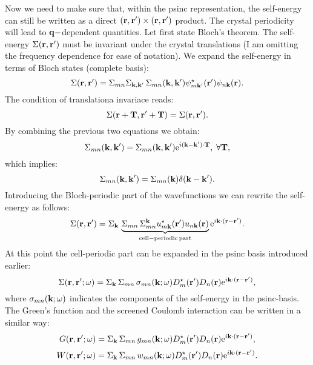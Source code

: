\documentclass[12pt]{article}
\def\k{{\bf k}}
\def\kp{{\bf k}^\prime}
\def\q{{\bf q}}
\def\r{{\bf r}}
\def\rp{{\bf r}^\prime}
\def\w{\omega}
\begin{document}
Now we need to make sure that, within the psinc representation, the self-energy can still be written
as a direct $(\r,\rp) \times (\r,\rp)$ product. The crystal periodicity will lead to $\q-$dependent
quantities. 
%
Let first state Bloch's theorem. The self-energy $\Sigma(\r,\rp)$ must be invariant under the crystal
translations (I am omitting the frequency dependence for ease of notation). We expand the self-energy
in terms of Bloch states (complete basis):
  \begin{equation}
  \Sigma(\r,\rp) = \Sigma_{mn}\Sigma_{\k,\kp} \, \Sigma_{mn}(\k,\kp) \psi^\star_{m\kp}(\rp) \psi_{n\k}(\r).
  \end{equation}
The condition of translationa invariace reads:
  \begin{equation}
  \Sigma(\r+{\bf T},\rp+{\bf T}) =  \Sigma(\r,\rp).
  \end{equation}
By combining the previous two equations we obtain:
  \begin{equation}
  \Sigma_{mn}(\k,\kp) =  \Sigma_{mn}(\k,\kp) {\rm e}^{i(\k-\kp)\cdot{\bf T}}, \; \forall {\bf T},
  \end{equation}
which implies:
  \begin{equation}
  \Sigma_{mn}(\k,\kp) =  \Sigma_{mn}(\k) \delta(\k-\kp).
  \end{equation}
Introducing the Bloch-periodic part of the wavefunctions we can rewrite the self-energy as follows:
  \begin{equation}
  \Sigma(\r,\rp) = \Sigma_\k \, \underbrace{\Sigma_{mn} \, \Sigma_{mn}^\k u^\star_{m\k}(\rp) u_{n\k}(\r)}_{\rm cell-periodic \, part} 
  {\rm e}^{i\k\cdot(\r-\rp)}.
  \end{equation}
At this point the cell-periodic part can be expanded in the psinc basis introduced earlier:
  \begin{equation}
  \Sigma(\r,\rp;\w) = \Sigma_\k \, \Sigma_{mn} \, \sigma_{mn}(\k;\w) D^\star_m(\rp) D_n(\r) {\rm e}^{i\k\cdot(\r-\rp)},
  \end{equation}
where $\sigma_{mn}(\k;\w)$ indicates the components of the self-energy in the psinc-basis.
The Green's function and the screened Coulomb interaction can be written in a similar way:
  \begin{equation}
  G(\r,\rp;\w) = \Sigma_\k \, \Sigma_{mn} \, g_{mn}(\k;\w) D^\star_m(\rp) D_n(\r) {\rm e}^{i\k\cdot(\r-\rp)},
  \end{equation}
  \begin{equation}
  W(\r,\rp;\w) = \Sigma_\k \, \Sigma_{mn} \, w_{mn}(\k;\w) D^\star_m(\rp) D_n(\r) {\rm e}^{i\k\cdot(\r-\rp)}.
  \end{equation}
\end{document}
